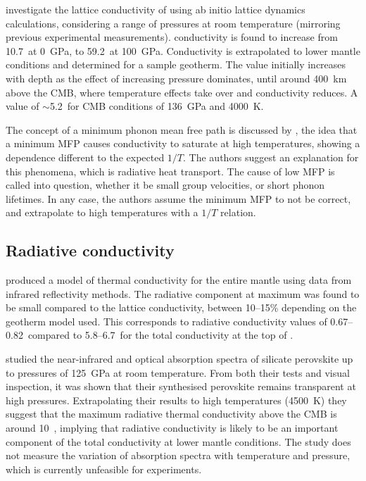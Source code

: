 \citet{Ghaderi2017} investigate the lattice conductivity of \bdgs using ab initio lattice dynamics calculations, considering a range of pressures at room temperature (mirroring previous experimental measurements). \mgsios conductivity is found to increase from 10.7~\wmk at 0~GPa, to 59.2~\wmk at 100~GPa. Conductivity is extrapolated to lower mantle conditions and determined for a sample geotherm. The value initially increases with depth as the effect of increasing pressure dominates, until around 400~km above the CMB, where temperature effects take over and conductivity reduces. A value of $\sim$5.2~\wmk for CMB conditions of 136~GPa and 4000~K. 


The concept of a minimum phonon mean free path is discussed by \citet{Ghaderi2017}, the idea that a minimum MFP causes conductivity to saturate at high temperatures, showing a dependence different to the expected $1/T$. The authors suggest an explanation for this phenomena, which is radiative heat transport. The cause of low MFP is called into question, whether it be small group velocities, or short phonon lifetimes. In any case, the authors assume the minimum MFP to not be correct, and extrapolate to high temperatures with a $1/T$ relation.

\subsection{Radiative conductivity}
\label{sec:rad_cond}

\citet{Hofmeister1999} produced a model of thermal conductivity for the entire mantle using data from infrared reflectivity methods. The radiative component at maximum was found to be small compared to the lattice conductivity, between 10--15\% depending on the geotherm model used. This corresponds to radiative conductivity values of 0.67--0.82~\wmks compared to 5.8--6.7~\wmks for the total conductivity at the top of \ddd.

\citet{Keppler2008} studied the near-infrared and optical absorption spectra of silicate perovskite up to pressures of 125~GPa at room temperature. From both their tests and visual inspection, it was shown that their synthesised perovskite remains transparent at high pressures. Extrapolating their results to high temperatures (4500~K) they suggest that the maximum radiative thermal conductivity above the CMB is around 10~\wmk, implying that radiative conductivity is likely to be an important component of the total conductivity at lower mantle conditions. The study does not measure the variation of absorption spectra with temperature and pressure, which is currently unfeasible for experiments.

